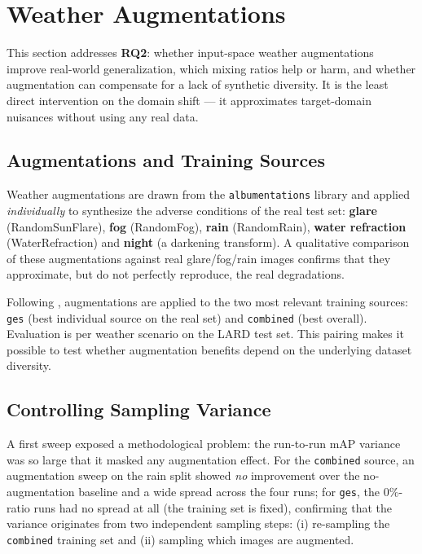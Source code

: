 \section{Weather Augmentations}
\label{sec:weather-aug}

This section addresses \textbf{RQ2}: whether input-space weather augmentations improve
real-world generalization, which mixing ratios help or harm, and whether augmentation
can compensate for a lack of synthetic diversity. It is the least direct intervention
on the domain shift --- it approximates target-domain nuisances without using any real
data.

\subsection{Augmentations and Training Sources}
\label{subsec:aug-design}
Weather augmentations are drawn from the \texttt{albumentations} library and applied
\emph{individually} to synthesize the adverse conditions of the real test set:
\textbf{glare} (RandomSunFlare), \textbf{fog} (RandomFog), \textbf{rain}
(RandomRain), \textbf{water refraction} (WaterRefraction) and \textbf{night}
(a darkening transform). A qualitative comparison of these augmentations against real
glare/fog/rain images confirms that they approximate, but do not perfectly reproduce,
the real degradations.

Following , augmentations are applied to the two most relevant training
sources: \texttt{ges} (best individual source on the real set) and \texttt{combined}
(best overall). Evaluation is per weather scenario on the LARD test set. This pairing
makes it possible to test whether augmentation benefits depend on the underlying
dataset diversity.

\subsection{Controlling Sampling Variance}
\label{subsec:aug-variance}
A first sweep exposed a methodological problem: the run-to-run mAP variance was so
large that it masked any augmentation effect. For the \texttt{combined} source, an
augmentation sweep on the rain split showed \emph{no} improvement over the
no-augmentation baseline and a wide spread across the four runs; for \texttt{ges}, the
$0\%$-ratio runs had no spread at all (the training set is fixed), confirming that the
variance originates from two independent sampling steps: (i) re-sampling the
\texttt{combined} training set and (ii) sampling which images are augmented.


